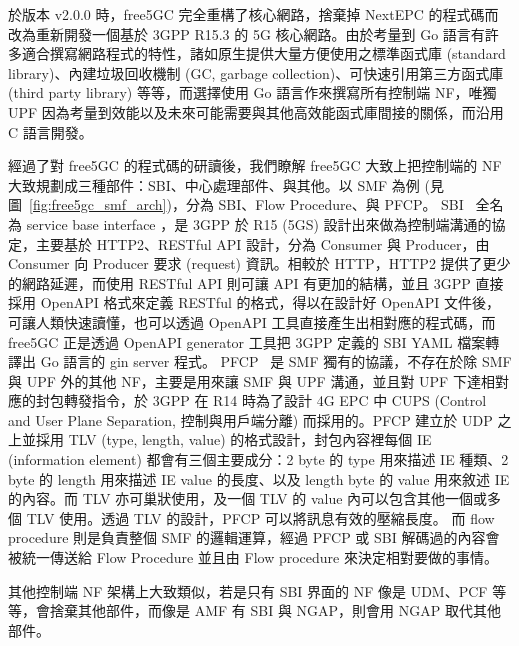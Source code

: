 於版本 v2.0.0 時，free5GC 完全重構了核心網路，捨棄掉 NextEPC 的程式碼而改為重新開發一個基於 3GPP R15.3 的 5G 核心網路。由於考量到 Go 語言有許多適合撰寫網路程式的特性，諸如原生提供大量方便使用之標準函式庫 (standard library)、內建垃圾回收機制 (GC, garbage collection)、可快速引用第三方函式庫 (third party library) 等等，而選擇使用 Go 語言作來撰寫所有控制端 NF，唯獨 UPF 因為考量到效能以及未來可能需要與其他高效能函式庫間接的關係，而沿用 C 語言開發。

經過了對 free5GC 的程式碼的研讀後，我們瞭解 free5GC 大致上把控制端的 NF 大致規劃成三種部件：SBI、中心處理部件、與其他。以 SMF 為例 (見圖~\ref{fig:free5gc_smf_arch})，分為 SBI、Flow Procedure、與 PFCP。
SBI~\cite{3gpp.29.500} 全名為 service base interface
，是 3GPP 於 R15 (5GS) 設計出來做為控制端溝通的協定，主要基於 HTTP2、RESTful API 設計，分為 Consumer 與 Producer，由 Consumer 向 Producer 要求 (request) 資訊。相較於 HTTP，HTTP2 提供了更少的網路延遲，而使用 RESTful API 則可讓 API 有更加的結構，並且 3GPP 直接採用 OpenAPI 格式來定義 RESTful 的格式，得以在設計好 OpenAPI 文件後，可讓人類快速讀懂，也可以透過 OpenAPI 工具直接產生出相對應的程式碼，而 free5GC 正是透過 OpenAPI generator 工具把 3GPP 定義的 SBI YAML 檔案轉譯出 Go 語言的 gin server 程式。
PFCP~\cite{3gpp.29.244} 是 SMF 獨有的協議，不存在於除 SMF 與 UPF 外的其他 NF，主要是用來讓 SMF 與 UPF 溝通，並且對 UPF 下達相對應的封包轉發指令，於 3GPP 在 R14 時為了設計 4G EPC 中 CUPS (Control and User Plane Separation, 控制與用戶端分離) 而採用的。PFCP 建立於 UDP 之上並採用 TLV (type, length, value) 的格式設計，封包內容裡每個 IE (information element) 都會有三個主要成分：2 byte 的 type 用來描述 IE 種類、2 byte 的 length 用來描述 IE value 的長度、以及 length byte 的 value 用來敘述 IE 的內容。而 TLV 亦可巢狀使用，及一個 TLV 的 value 內可以包含其他一個或多個 TLV 使用。透過 TLV 的設計，PFCP 可以將訊息有效的壓縮長度。
而 flow procedure 則是負責整個 SMF 的邏輯運算，經過 PFCP 或 SBI 解碼過的內容會被統一傳送給 Flow Procedure 並且由 Flow procedure 來決定相對要做的事情。

其他控制端 NF 架構上大致類似，若是只有 SBI 界面的 NF 像是 UDM、PCF 等等，會捨棄其他部件，而像是 AMF 有 SBI 與 NGAP，則會用 NGAP 取代其他部件。

